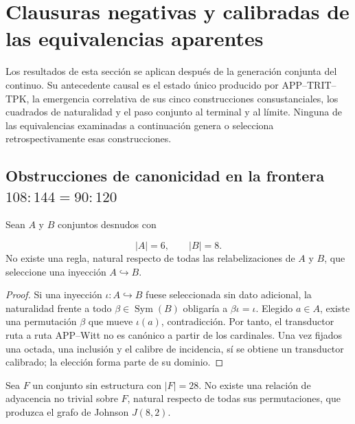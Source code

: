 
\section{Clausuras negativas y calibradas de las equivalencias aparentes}
\label{sec:hmt-final-clausuras-negativas-calibradas}

Los resultados de esta sección se aplican después de la generación conjunta
del continuo. Su antecedente causal es el estado único producido por
APP--TRIT--TPK, la emergencia correlativa de sus cinco construcciones
consustanciales, los cuadrados de naturalidad y el paso conjunto al terminal
y al límite. Ninguna de las equivalencias examinadas a continuación genera o
selecciona retrospectivamente esas construcciones.

\subsection{Obstrucciones de canonicidad en la frontera
\texorpdfstring{\(108{:}144=90{:}120\)}{108:144=90:120}}

\begin{theorem}
\label{thm:hmt-final-no-inclusion-canonica-seis-ocho}
Sean \(A\) y \(B\) conjuntos desnudos con

\[
 |A|=6,
 \qquad |B|=8.
\]
No existe una regla, natural respecto de todas las relabelizaciones de \(A\)
y \(B\), que seleccione una inyección \(A\hookrightarrow B\).
\end{theorem}

\begin{proof}
Si una inyección \(\iota:A\hookrightarrow B\) fuese seleccionada sin dato
adicional, la naturalidad frente a todo \(\beta\in\operatorname{Sym}(B)\)
obligaría a \(\beta\iota=\iota\). Elegido \(a\in A\), existe una permutación
\(\beta\) que mueve \(\iota(a)\), contradicción. Por tanto, el transductor
ruta a ruta APP--Witt no es canónico a partir de los cardinales. Una vez
fijados una octada, una inclusión y el calibre de incidencia, sí se obtiene un
transductor calibrado; la elección forma parte de su dominio.
\end{proof}

\begin{theorem}
\label{thm:hmt-final-no-johnson-desde-cardinal}
Sea \(F\) un conjunto sin estructura con \(|F|=28\). No existe una relación
de adyacencia no trivial sobre \(F\), natural respecto de todas sus
permutaciones, que produzca el grafo de Johnson \(J(8,2)\).
\end{theorem}

